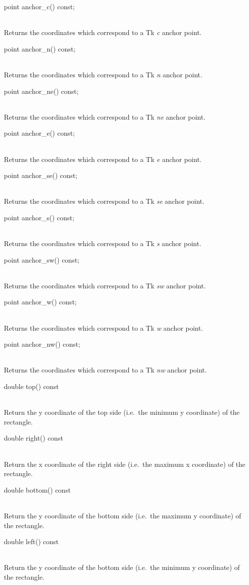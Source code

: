\documentclass[twoside,fleqn]{report}
\begin{document}
\begin{Cdefinition}
  \item[point anchor\_c() const;] \strut\\
  Returns the coordinates which correspond to a Tk \emph{c} anchor point.
  \item[point anchor\_n() const;] \strut\\
  Returns the coordinates which correspond to a Tk \emph{n} anchor point.
  \item[point anchor\_ne() const;] \strut\\
  Returns the coordinates which correspond to a Tk \emph{ne} anchor point.
  \item[point anchor\_e() const;] \strut\\
  Returns the coordinates which correspond to a Tk \emph{e} anchor point.
  \item[point anchor\_se() const;] \strut\\
  Returns the coordinates which correspond to a Tk \emph{se} anchor point.
  \item[point anchor\_s() const;] \strut\\
  Returns the coordinates which correspond to a Tk \emph{s} anchor point.
  \item[point anchor\_sw() const;] \strut\\
  Returns the coordinates which correspond to a Tk \emph{sw} anchor point.
  \item[point anchor\_w() const;] \strut\\
  Returns the coordinates which correspond to a Tk \emph{w} anchor point.
  \item[point anchor\_nw() const;] \strut\\
  Returns the coordinates which correspond to a Tk \emph{nw} anchor point.
  \item[double top() const] \strut\\
  Return the y coordinate of the top side (i.e.\ the minimum y coordinate) 
  of the rectangle.
  \item[double right() const] \strut\\
  Return the x coordinate of the right side (i.e.\ the maximum x coordinate) 
  of the rectangle.
  \item[double bottom() const] \strut\\
  Return the y coordinate of the bottom side (i.e.\ the maximum y 
  coordinate) of the rectangle.
  \item[double left() const] \strut\\
  Return the y coordinate of the bottom side (i.e.\ the minimum y 
  coordinate) of the rectangle.

\end{Cdefinition}
\end{document}
